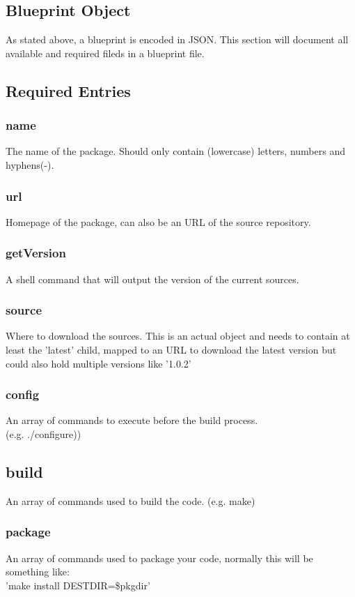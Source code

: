\documentclass[]{article}
\begin{document}
\begin{multicols}{2}
	\section{Blueprint Object}
	As stated above, a blueprint is encoded in JSON. This section will document all available  and required fileds in a blueprint file.

	\subsection{Required Entries}

		\subsubsection{name}
		The name of the package. Should only contain (lowercase) letters, numbers and hyphens(-).
		\subsubsection{url}
		Homepage of the package, can also be an URL of
		the source repository.
		\subsubsection{getVersion}
		A shell command that will output the version
		of the current sources.
		\subsubsection{source}
		Where to download the sources. This is an actual object and needs to contain at least the 'latest' child, mapped to an URL to download the latest version but could also hold multiple versions like '1.0.2'
		\subsubsection{config}
		An array of commands to execute before the build process. \\(e.g. ./configure))
		\subsection{build}
		An array of commands used to build the code.
		(e.g. make)
		\subsubsection{package}
		An array of commands used to package your code, normally this will be something like:\\'make install DESTDIR=\$pkgdir'

\end{multicols}
\end{document}
